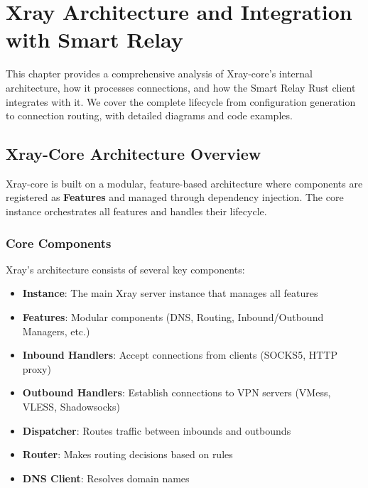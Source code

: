\chapter{Xray Architecture and Integration with Smart Relay}

This chapter provides a comprehensive analysis of Xray-core's internal architecture, how it processes connections, and how the Smart Relay Rust client integrates with it. We cover the complete lifecycle from configuration generation to connection routing, with detailed diagrams and code examples.

\section{Xray-Core Architecture Overview}

Xray-core is built on a modular, feature-based architecture where components are registered as \textbf{Features} and managed through dependency injection. The core instance orchestrates all features and handles their lifecycle.

\subsection{Core Components}

Xray's architecture consists of several key components:

\begin{itemize}
    \item \textbf{Instance}: The main Xray server instance that manages all features
    \item \textbf{Features}: Modular components (DNS, Routing, Inbound/Outbound Managers, etc.)
    \item \textbf{Inbound Handlers}: Accept connections from clients (SOCKS5, HTTP proxy)
    \item \textbf{Outbound Handlers}: Establish connections to VPN servers (VMess, VLESS, Shadowsocks)
    \item \textbf{Dispatcher}: Routes traffic between inbounds and outbounds
    \item \textbf{Router}: Makes routing decisions based on rules
    \item \textbf{DNS Client}: Resolves domain names
\end{itemize}

